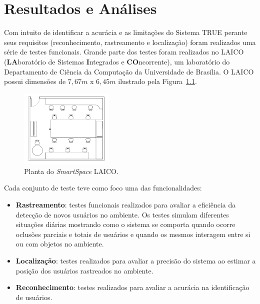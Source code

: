 \chapter{Resultados e Análises}
\label{cap:testes}

	Com intuito de identificar a acurácia e as limitações do Sistema TRUE perante
	seus requisitos (reconhecimento, rastreamento e localização) foram realizados
	uma série de testes funcionais. Grande parte dos testes foram realizados no LAICO
	(\textbf{LA}boratório de Sistemas \textbf{I}ntegrados e \textbf{CO}ncorrente),
	um laboratório do Departamento de Ciência da Computação da Universidade de
	Brasília. O LAICO possui dimensões de $\displaystyle 7,67m$ x $\displaystyle
	6,45m$ ilustrado pela Figura~\ref{fig:laico}.

	\begin{figure}[htb]
		\begin{center}
 			\includegraphics[width=0.4\textwidth]{figuras/4.ProblemaEProposta/laico.png}
 		\end{center}
 		\caption{Planta do \textit{SmartSpace} LAICO.}
		\label{fig:laico}
	\end{figure}	

	Cada conjunto de teste teve como foco uma das funcionalidades:

	\begin{itemize}
		\item \textbf{Rastreamento}: testes funcionais realizados para avaliar a
		eficiência da detecção de novos usuários no ambiente. Os testes simulam
		diferentes situações diárias mostrando como o sistema se comporta quando
		ocorre oclusões parciais e totais de usuários e quando os mesmos interagem
		entre si ou com objetos no ambiente.

		\item \textbf{Localização}: testes realizados para avaliar a precisão do
		sistema ao estimar a posição dos usuários rastreados no ambiente.
		
		\item \textbf{Reconhecimento}: testes realizados para avaliar a acurácia na
		identificação de usuários.
	\end{itemize}

